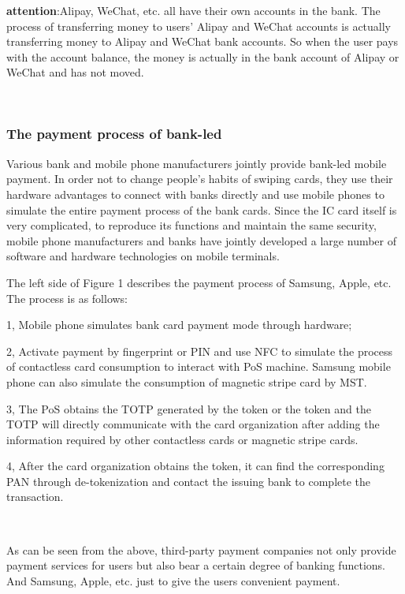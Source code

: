 \documentclass[journal]{IEEEtran}
\begin{document}
\textbf{attention}:Alipay, WeChat, etc. all have their own accounts in the bank. The process of transferring money to users' Alipay and WeChat accounts is actually transferring money to Alipay and WeChat bank accounts. So when the user pays with the account balance, the money is actually in the bank account of Alipay or WeChat and has not moved.

\

\subsubsection{The payment process of bank-led}
Various bank and mobile phone manufacturers jointly provide bank-led mobile payment. In order not to change people's habits of swiping cards, they use their hardware advantages to connect with banks directly and use mobile phones to simulate the entire payment process of the bank cards. Since the IC card itself is very complicated, to reproduce its functions and maintain the same security, mobile phone manufacturers and banks have jointly developed a large number of software and hardware technologies on mobile terminals.


The left side of Figure 1 describes the payment process of Samsung, Apple, etc. The process is as follows:

1, Mobile phone simulates bank card payment mode through hardware;

2, Activate payment by fingerprint or PIN and use NFC to simulate the process of contactless card consumption to interact with PoS machine. Samsung mobile phone can also simulate the consumption of magnetic stripe card by MST. 

3, The PoS obtains the TOTP generated by the token or the token and the TOTP will directly communicate with the card organization after adding the information required by other contactless cards or magnetic stripe cards.

4, After the card organization obtains the token, it can find the corresponding PAN through de-tokenization and contact the issuing bank to complete the transaction.

\

As can be seen from the above, third-party payment companies not only provide payment services for users but also bear a certain degree of banking functions. And Samsung, Apple, etc. just to give the users convenient payment.
\end{document}
